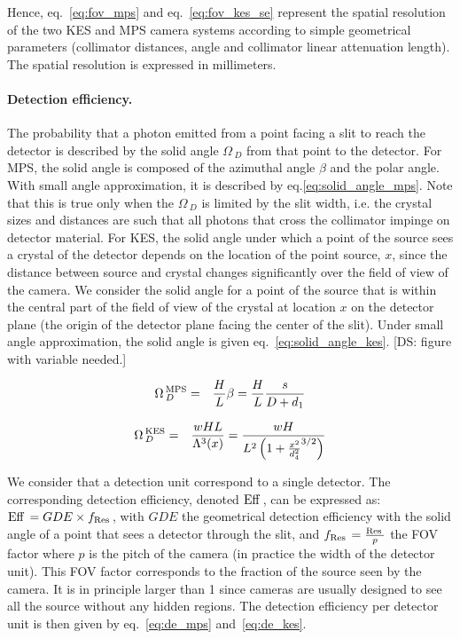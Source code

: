 \documentclass[a4paper,english]{article}
\newcommand\ds[1]{\color{orange}[DS: #1]\color{black}}
\begin{document}
Hence, eq.~\ref{eq:fov_mps} and eq.~\ref{eq:fov_kes_se} represent the spatial
resolution of the two KES and MPS camera systems according to simple geometrical
parameters (collimator distances, angle and collimator linear attenuation
length). The spatial resolution is expressed in millimeters. 

\paragraph{Detection efficiency.}

The probability that a photon emitted from a point facing a slit to reach the
detector is described by the solid angle $\Omega\,_D$ from that point to the
detector. For MPS, the solid angle is composed of the azimuthal angle $\beta$
and the polar angle. With small angle approximation, it is described by
eq.\ref{eq:solid_angle_mps}. Note that this is true only when the $\Omega\,_D$ is
limited by the slit width, i.e. the crystal sizes and distances are such that
all photons that cross the collimator impinge on detector material. For KES, the
solid angle under which a point of the source sees a crystal of the detector
depends on the location of the point source, $x$, since the distance between source
and crystal changes significantly over the field of view of the camera. We
consider the solid angle for a point of the source that is within the central
part of the field of view of the crystal at location $x$ on the detector plane
(the origin of the detector plane facing the center of the slit). Under small
angle approximation, the solid angle is given eq.~\ref{eq:solid_angle_kes}.
\ds{figure with variable needed.}

\begin{eqnarray}
  \label{eq:solid_angle_mps}
  \Omega\,_D^{\textrm{MPS}} & = & \frac{H}{L}\beta = \frac{H}{L} \frac{s}{D+d_1}
\end{eqnarray}


\begin{eqnarray}
  \label{eq:solid_angle_kes}
  \Omega\,_D^{\textrm{KES}} & = & \frac{w H L}{\Lambda^3(x)} 
                  =  \frac{w H}{L^2 \left( 1+\frac{x^2}{d_4^2}^{3/2} \right)}
\end{eqnarray}


We consider that a detection unit correspond to a single detector. The
corresponding detection efficiency, denoted $\textrm{Eff}\,_{}$, can be expressed as:
$\textrm{Eff}\,_{} = GDE \times f_{\textrm{Res}\,}$, with $GDE$ the geometrical detection
efficiency with the solid angle of a point that sees a detector through the
slit, and $f_{\textrm{Res}\,} = \frac{\textrm{Res}\,_{}}{p}$ the FOV factor where $p$ is the
pitch of the camera (in practice the width of the detector unit). This FOV
factor corresponds to the fraction of the source seen by the camera. It is in
principle larger than 1 since cameras are usually designed to see all the source
without any hidden regions. The detection efficiency per detector unit is then
given by eq.~\ref{eq:de_mps} and~\ref{eq:de_kes}.
\end{document}
